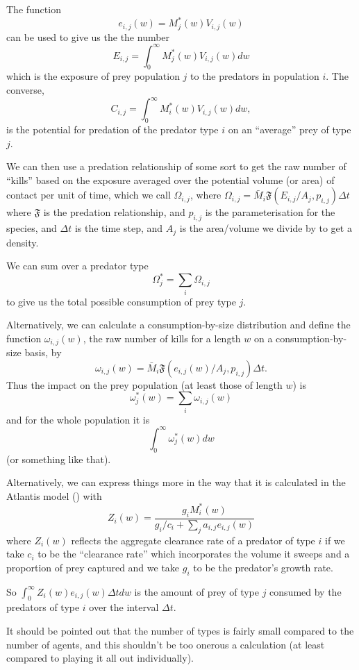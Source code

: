 The function
\[ e_{i,j} (w) = M^{\ast}_j (w) V_{i,j} (w)  \]
can be used to give us the the number
\[ E_{i,j} = \int_0^{\infty} M^{\ast}_j (w) V_{i,j} (w) d w \]
which is the exposure of prey population $j$ to the predators in
population $i$. The converse,
\[ C_{i,j} = \int_0^{\infty} M_i^{\ast} (w) V_{i,j} (w) d w, \]
is the potential for predation of the predator type $i$ on an ``average'' prey
of type $j$.

We can then use a predation relationship of some sort to get the raw
number of ``kills'' based on the exposure averaged over the potential
volume (or area) of contact per unit of time, which we call $\Omega_{i,j}$, where $\Omega_{i,j} = \bar{M}_i \mathfrak{F} (E_{i,j} / A_j,
p_{i,j}) \Delta t$ where $\mathfrak{F}$ is the predation relationship,
and $p_{i,j}$ is the parameterisation for the species, and $\Delta t$
is the time step, and $A_j$ is the area/volume we divide by to get a
density.

We can sum over a predator type
\[ \Omega_j^{\ast} = \sum_i \Omega_{i,j} \]
to give us the total possible consumption of prey type $j$.

Alternatively, we can calculate a consumption-by-size distribution and define
the function $\omega_{i,j} (w)$, the raw number of kills for a length $w$ on a
consumption-by-size basis, by
\[ \omega_{i,j} (w) = \bar{M}_i \mathfrak{F} (e_{i,j} (w) / A_j, p_{i,j})
   \Delta t. \]
Thus the impact on the prey population (at least those of length $w$) is
\[ \omega_j^{\ast} (w) = \sum_i \omega_{i,j} (w) \]
and for the whole population it is
\[ \int_0^{\infty} \omega^{\ast}_j (w) d w \]
(or something like that).

Alternatively, we can express things more in the way that it is
calculated in the Atlantis model (\cite{Fulton2011pcomm}) with
\[ Z_i (w) = \frac{g_i M^{\ast}_i (w)}{g_i / c_i + \sum_j a_{i,j} e_{i,j} (w)}
\]
where $Z_i (w)$ reflects the aggregate clearance rate of a predator of type
$i$ if we take $c_i$ to be the ``clearance rate'' which incorporates the
volume it sweeps and a proportion of prey captured and we take $g_i$ to be the
predator's growth rate.

So $\int_0^{\infty} Z_i (w) e_{i,j} (w) \Delta t d w$ is the amount of prey of
type $j$ consumed by the predators of type $i$ over the interval $\Delta t$.



It should be pointed out that the number of types is fairly small compared to
the number of agents, and this shouldn't be too onerous a calculation (at
least compared to playing it all out individually).

